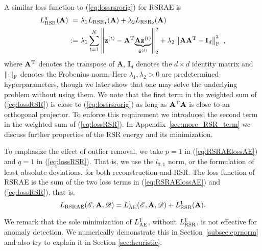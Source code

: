 \documentclass{article} \usepackage{iclr2020_conference,times}
\def\Secref#1{Section~\ref{#1}}
\def\eqref#1{(\ref{#1})}
\def\rvz{{\mathbf{z}}}
\def\rmA{{\mathbf{A}}}
\def\rmI{{\mathbf{I}}}
\newcommand{\norm}[1]{\left\lVert#1\right\rVert}
\begin{document}
A similar loss function to \eqref{eq:lossrsrorig} for RSRAE is
\begin{equation}\label{eq:lossRSR}
\begin{split}
    L_{\rm{RSR}}^q (\rmA) ~=~ & \lambda_1 L_{\rm{RSR_1}}(\rmA) + \lambda_2 L_{\rm{RSR_2}}(\rmA) \\
    ~:=~ & \lambda_1 \sum_{t=1}^N \norm{\rvz^{(t)} - \rmA^{\rm{T}}\underset{\tilde{\rvz}^{(t)}}{\underbrace{
    \rmA \rvz^{(t)}}}}_2^q + \lambda_2 \norm{\rmA \rmA^{\rm{T}} - \rmI_d}_{\rm{F}}^2 ~,
\end{split}
\end{equation}
where $\rmA^{\rm{T}}$ denotes the transpose of $\rmA$, $\rmI_d$ denotes the $d \times d$ identity matrix and $\norm{\cdot}_{\rm{F}}$ denotes the Frobenius norm. Here $\lambda_1, \lambda_2 > 0$ are predetermined hyperparameters, though we later show that one may solve the underlying problem without using them. We note that the first term in the weighted sum of \eqref{eq:lossRSR} is close to \eqref{eq:lossrsrorig} as long as $\rmA^{\rm{T}} \rmA$ is close to an orthogonal projector. To enforce this requirement we introduced the second term in the weighted sum of \eqref{eq:lossRSR}. 
In Appendix~\ref{sec:more_RSR_term} we discuss further properties of the RSR energy and its minimization. 

To emphasize the effect of outlier removal, we take $p=1$ in \eqref{eq:RSRAElossAE} and $q=1$ in \eqref{eq:lossRSR}. That is, we use the $l_{2,1}$ norm, or the formulation of least absolute deviations, for both  reconstruction and RSR. The loss function of RSRAE is the sum of
the two loss terms in \eqref{eq:RSRAElossAE} and \eqref{eq:lossRSR}, that is, \begin{equation}
\label{eq:combined}
L_{\rm{RSRAE}}(\mathscr{E}, \rmA, \mathscr{D}) = L_{\rm{AE}}^1 (\mathscr{E}, \rmA, \mathscr{D}) + L_{\rm{RSR}}^1 (\rmA). \end{equation}

We remark that the sole minimization of $L_{\rm{AE}}^1$, without $L_{\rm{RSR}}^1$, is not effective for anomaly detection. We  numerically demonstrate this in \Secref{subsec:cprnorm} and also try to 
explain it in Section \ref{sec:heuristic}.
\end{document}
